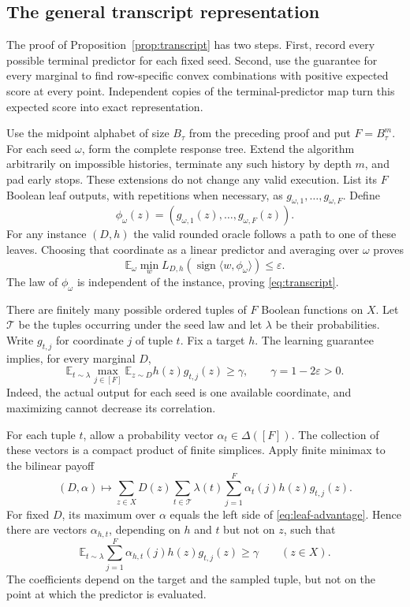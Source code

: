 \documentclass[11pt,letterpaper,pmlr,twoside]{jmlr}
\newcommand{\E}{\mathbb E}
\newcommand{\eps}{\varepsilon}
\newcommand{\sgn}{\operatorname{sign}}
\newcommand{\ip}[2]{\langle #1,#2\rangle}
\begin{document}
\subsection{The general transcript representation}
The proof of Proposition~\ref{prop:transcript} has two steps. First, record every possible terminal predictor for each fixed seed. Second, use the guarantee for every marginal to find row-specific convex combinations with positive expected score at every point. Independent copies of the terminal-predictor map turn this expected score into exact representation.

Use the midpoint alphabet of size $B_\tau$ from the preceding proof and put $F=B_\tau^m$. For each seed $\omega$, form the complete response tree. Extend the algorithm arbitrarily on impossible histories, terminate any such history by depth $m$, and pad early stops. These extensions do not change any valid execution. List its $F$ Boolean leaf outputs, with repetitions when necessary, as $g_{\omega,1},\ldots,g_{\omega,F}$. Define
\[
 \phi_\omega(z)=(g_{\omega,1}(z),\ldots,g_{\omega,F}(z)).
\]
For any instance $(D,h)$ the valid rounded oracle follows a path to one of these leaves. Choosing that coordinate as a linear predictor and averaging over $\omega$ proves
\[
 \E_\omega\min_wL_{D,h}(\sgn\ip w{\phi_\omega})\le\eps.
\]
The law of $\phi_\omega$ is independent of the instance, proving \eqref{eq:transcript}.

There are finitely many possible ordered tuples of $F$ Boolean functions on $X$. Let $\mathcal T$ be the tuples occurring under the seed law and let $\lambda$ be their probabilities. Write $g_{t,j}$ for coordinate $j$ of tuple $t$. Fix a target $h$. The learning guarantee implies, for every marginal $D$,
\begin{equation}
 \E_{t\sim\lambda}\max_{j\in[F]}\E_{z\sim D}h(z)g_{t,j}(z)\ge\gamma,
 \qquad \gamma=1-2\eps>0.
 \label{eq:leaf-advantage}
\end{equation}
Indeed, the actual output for each seed is one available coordinate, and maximizing cannot decrease its correlation.

For each tuple $t$, allow a probability vector $\alpha_t\in\Delta([F])$. The collection of these vectors is a compact product of finite simplices. Apply finite minimax to the bilinear payoff
\[
 (D,\alpha)\longmapsto
 \sum_{z\in X}D(z)\sum_{t\in\mathcal T}\lambda(t)
       \sum_{j=1}^F\alpha_t(j)h(z)g_{t,j}(z).
\]
For fixed $D$, its maximum over $\alpha$ equals the left side of \eqref{eq:leaf-advantage}. Hence there are vectors $\alpha_{h,t}$, depending on $h$ and $t$ but not on $z$, such that
\begin{equation}
 \E_{t\sim\lambda}\sum_{j=1}^F\alpha_{h,t}(j)h(z)g_{t,j}(z)\ge\gamma
 \qquad(z\in X).
 \label{eq:pointwise-advantage}
\end{equation}
The coefficients depend on the target and the sampled tuple, but not on the point at which the predictor is evaluated.
\end{document}
